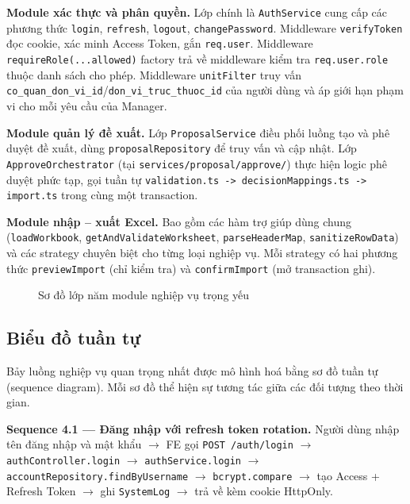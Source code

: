 \documentclass[../DoAn.tex]{subfiles}
\begin{document}
\textbf{Module xác thực và phân quyền.} Lớp chính là \texttt{AuthService} cung cấp các phương thức \texttt{login}, \texttt{refresh}, \texttt{logout}, \texttt{changePassword}. Middleware \texttt{verifyToken} đọc cookie, xác minh Access Token, gắn \texttt{req.user}. Middleware \texttt{requireRole(...allowed)} factory trả về middleware kiểm tra \texttt{req.user.role} thuộc danh sách cho phép. Middleware \texttt{unitFilter} truy vấn \texttt{co\_quan\_don\_vi\_id}/\texttt{don\_vi\_truc\_thuoc\_id} của người dùng và áp giới hạn phạm vi cho mỗi yêu cầu của Manager.

\textbf{Module quản lý đề xuất.} Lớp \texttt{ProposalService} điều phối luồng tạo và phê duyệt đề xuất, dùng \texttt{proposalRepository} để truy vấn và cập nhật. Lớp \texttt{ApproveOrchestrator} (tại \texttt{services/proposal/approve/}) thực hiện logic phê duyệt phức tạp, gọi tuần tự \texttt{validation.ts -> decisionMappings.ts -> import.ts} trong cùng một transaction.

\textbf{Module nhập -- xuất Excel.} Bao gồm các hàm trợ giúp dùng chung (\texttt{loadWorkbook}, \texttt{getAndValidateWorksheet}, \texttt{parseHeaderMap}, \texttt{sanitizeRowData}) và các strategy chuyên biệt cho từng loại nghiệp vụ. Mỗi strategy có hai phương thức \texttt{previewImport} (chỉ kiểm tra) và \texttt{confirmImport} (mở transaction ghi).

\begin{figure}[H]
    \centering
    \caption{Sơ đồ lớp năm module nghiệp vụ trọng yếu}
    \label{fig:lop-modules}
\end{figure}

\subsection{Biểu đồ tuần tự}
\label{subsection:4.1.6}

Bảy luồng nghiệp vụ quan trọng nhất được mô hình hoá bằng sơ đồ tuần tự (sequence diagram). Mỗi sơ đồ thể hiện sự tương tác giữa các đối tượng theo thời gian.

\textbf{Sequence 4.1 --- Đăng nhập với refresh token rotation.} Người dùng nhập tên đăng nhập và mật khẩu $\rightarrow$ FE gọi \texttt{POST /auth/login} $\rightarrow$ \texttt{authController.login} $\rightarrow$ \texttt{authService.login} $\rightarrow$ \texttt{accountRepository.findByUsername} $\rightarrow$ \texttt{bcrypt.compare} $\rightarrow$ tạo Access + Refresh Token $\rightarrow$ ghi \texttt{SystemLog} $\rightarrow$ trả về kèm cookie HttpOnly.
\end{document}
